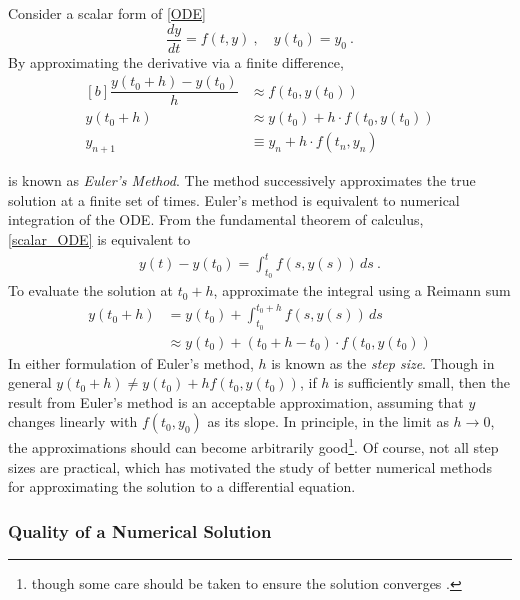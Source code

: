 Consider a scalar form of \cref{ODE}
%
\begin{equation}\label{scalar_ODE}
\dfrac{dy}{dt} = f(t,y) \>, \quad y(t_0) = y_0 \>.
\end{equation}
%
By approximating the derivative via a finite difference,
%
\begin{equation}\label{EuerlMethod}
\begin{aligned}[b]
\dfrac{y(t_0 + h) - y(t_0)}{h} &\approx f(t_0,y(t_0)) \\
y(t_0+h) &\approx y(t_0) + h\cdot f(t_0, y(t_0))\\
y_{n+1} & \equiv y_{n}+ h \cdot f(t_n,y_n)
\end{aligned}
\end{equation}

 is known as \textit{Euler's Method}.  The method successively approximates the true solution at a finite set of times. Euler's method is equivalent to numerical integration of the ODE.  From the fundamental theorem of calculus, \cref{scalar_ODE} is equivalent to
%
\begin{align*}
y(t) - y(t_0) = \int_{t_0}^t f(s,y(s)) \, ds \>.
\end{align*}
%
To evaluate the solution at $ t_0+h $, approximate the integral using a Reimann sum
%
\begin{equation}
\begin{aligned}
y(t_0+h) &= y(t_0) + \int_{t_0}^{t_0+h}f(s,y(s)) \, ds \\
&\approx y(t_0) + (t_0 + h - t_0)\cdot f(t_0, y(t_0))
\end{aligned}
\end{equation}
In either formulation of Euler's method, $ h $ is known as the \textit{step size}. Though in general $ y(t_0+h) \neq y(t_0) + hf(t_0,y(t_0)) $, if $ h $ is sufficiently small, then the result from Euler's method is an acceptable approximation, assuming that $ y $ changes linearly with $ f(t_0, y_0) $ as its slope. In principle, in the limit as $ h \rightarrow 0 $, the approximations should can become arbitrarily good\footnote{though some care should be taken to ensure the solution converges \cite{corless2013graduate}.}.  Of course, not all step sizes are practical, which has motivated the study of better numerical methods for approximating the solution to a differential equation.

\subsubsection{Quality of a Numerical Solution}

